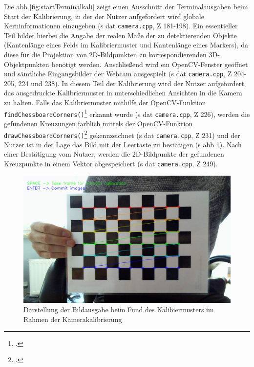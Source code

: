 \noindent Die \acs{abb} \ref{fig:startTerminalkali} zeigt einen Ausschnitt der Terminalausgaben beim Start der Kalibrierung, in der der Nutzer aufgefordert wird globale Kerninformationen einzugeben (\acs{s} \acs{dat} \texttt{camera.cpp}, \acs{Z} 181-198). Ein essentieller Teil bildet hierbei die Angabe der realen Maße der zu detektierenden Objekte (Kantenlänge eines Felds im Kalibriermuster und Kantenlänge eines Markers), da diese für die Projektion von 2D-Bildpunkten zu korrespondierenden 3D-Objektpunkten benötigt werden. Anschließend wird ein OpenCV-Fenster geöffnet und sämtliche Eingangsbilder der Webcam ausgespielt (\acs{s} \acs{dat} \texttt{camera.cpp}, \acs{Z} 204-205, 224 und 238). In diesem Teil der Kalibrierung wird der Nutzer aufgefordert, das ausgedruckte Kalibriermuster in unterschiedlichen Ansichten in die Kamera zu halten. Falls das Kalibriermuster mithilfe der OpenCV-Funktion \texttt{findChessboardCorners()}\footcite{opencvfindChessboardCorners} erkannt wurde (\acs{s} \acs{dat} \texttt{camera.cpp}, \acs{Z} 226), werden die gefundenen Kreuzungen farblich mittels der OpenCV-Funktion \texttt{drawChessboardCorners()}\footcite{opencvdrawChessboardCorners} gekennzeichnet (\acs{s} \acs{dat} \texttt{camera.cpp}, \acs{Z} 231) und der Nutzer ist in der Lage das Bild mit der Leertaste zu bestätigen (\acs{s} \acs{abb} \ref{fig:live_calibration}). Nach einer Bestätigung vom Nutzer, werden die 2D-Bildpunkte der gefundenen Kreuzpunkte in einem Vektor abgespeichert (\acs{s} \acs{dat} \texttt{camera.cpp}, \acs{Z} 249).

\begin{figure}[H]
\centering
\includegraphics[width=13cm]{Bilder/Implementierung/live_calibration.png}
\caption{Darstellung der Bildausgabe beim Fund des Kalibiermusters im Rahmen der Kamerakalibrierung}
\label{fig:live_calibration}
\end{figure}

